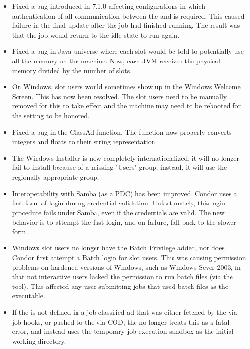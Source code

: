 \begin{itemize}

\item Fixed a bug introduced in 7.1.0 affecting configurations in
which authentication of all communication between the 
and  is required.  This caused failure in the final update
after the job had finished running.  The result was that the job would return
to the idle state to run again.

\item Fixed a bug in Java universe where each slot would be told to
  potentially use all the memory on the machine.  Now, each JVM 
  receives the physical memory divided by the number of slots.

\item On Windows, slot users would sometimes show up in the Windows Welcome
  Screen.  This has now been resolved.
  The slot users need to be manually
  removed for this to take effect and the machine may need to be rebooted for
  the setting to be honored.

\item Fixed a bug in the ClassAd  function.
  The function now properly converts integers and floats
  to their string representation.

\item The Windows Installer is now completely internationalized: it will no 
  longer fail to install because of a missing "Users" group; instead, it
  will use the regionally appropriate group.

\item Interoperability with Samba (as a PDC) has been improved.  Condor 
  uses a fast form of login during credential validation.  Unfortunately, 
  this login procedure fails under Samba, even if the credentials are 
  valid.  The new behavior is to attempt the fast login, and on failure, 
  fall back to the slower form.

\item Windows slot users no longer have the Batch Privilege added, nor 
  does Condor first attempt a Batch login for slot users.  This was 
  causing permission problems on hardened versions of Windows, such 
  as Windows Sever 2003, in that not interactive users lacked the 
  permission to run batch files (via the  tool). This affected 
  any user submitting jobs that used batch files as the executable.

\item If the  is not defined in a job classified
  ad that was either fetched by the  via job hooks, or
  pushed to the  via COD, the  no
  longer treats this as a fatal error, and instead uses the temporary
  job execution sandbox as the initial working directory.


\end{itemize}
